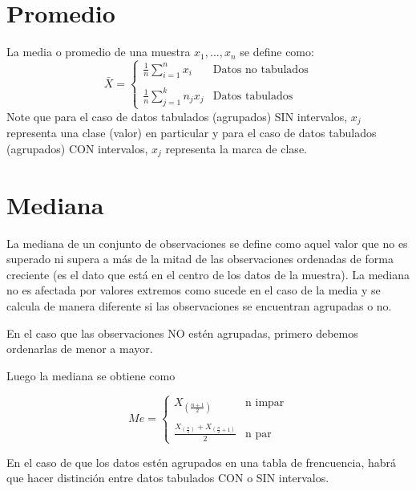 \documentclass[12pt,twocolumn,a4paper]{report}
\begin{document}
\section*{Promedio}
La media o promedio de una muestra $x_1,... ,x_n$ se define como: 
\begin{equation*}
\bar{X}= \left\{ \begin{array}{lc}
             \frac{1}{n}\sum_{i=1}^{n}x_i  & \text{Datos no tabulados} \\
             \\ \frac{1}{n}\sum_{j=1}^{k}n_j x_j  & \text{Datos tabulados} 
             \end{array}
   \right.
\end{equation*}
Note que para el caso de datos tabulados (agrupados) SIN intervalos, $x_j$ representa una clase (valor) en particular y para el caso de datos tabulados (agrupados) CON intervalos, $x_j$ representa la marca de clase. 

\section*{Mediana}
La mediana de un conjunto de observaciones se define como aquel valor que no es superado ni supera a más de la mitad de las observaciones ordenadas de forma creciente (es el dato que está en el centro de los datos de la muestra). La mediana no es afectada por valores extremos como sucede en el caso de la media y se calcula de manera diferente si las observaciones se encuentran agrupadas o no.

En el caso que las observaciones NO estén agrupadas, primero debemos ordenarlas de menor a mayor. 

Luego la mediana se obtiene como 

\begin{equation*}
Me= \left\{ \begin{array}{lc}
             X_{\left(\frac{n+1}{2}\right)} & \text{n impar} \\
             \\ \frac{X_{\left(\frac{n}{2}\right)}+X_{\left(\frac{n}{2}+1\right)}}{2} & \text{n par}
             \end{array}
   \right.
\end{equation*}

En el caso de que los datos estén agrupados en una tabla de frencuencia, habrá que hacer distinción entre datos tabulados CON o SIN intervalos.
\end{document}
